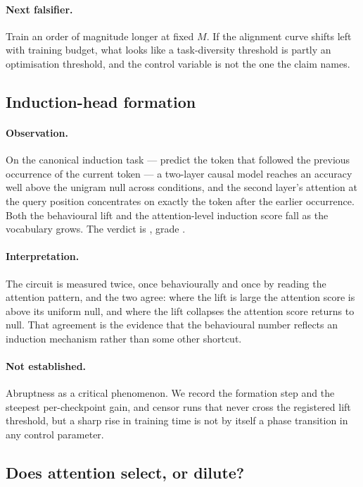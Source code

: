 \paragraph{Next falsifier.}
Train an order of magnitude longer at fixed $M$. If the alignment curve shifts
left with training budget, what looks like a task-diversity threshold is partly
an optimisation threshold, and the control variable is not the one the claim
names.

\subsection{Induction-head formation}

\paragraph{Observation.}
On the canonical induction task --- predict the token that followed the
previous occurrence of the current token --- a two-layer causal model reaches an
accuracy well above the unigram null across
\AtlasInductionHeadConditions{} conditions, and the second layer's attention at
the query position concentrates on exactly the token after the earlier
occurrence. Both the behavioural lift and the attention-level induction score
fall as the vocabulary grows. The verdict is
\emph{\AtlasInductionHeadVerdict{}}, grade \AtlasInductionHeadGrade{}.

\paragraph{Interpretation.}
The circuit is measured twice, once behaviourally and once by reading the
attention pattern, and the two agree: where the lift is large the attention
score is above its uniform null, and where the lift collapses the attention
score returns to null. That agreement is the evidence that the behavioural
number reflects an induction mechanism rather than some other shortcut.

\paragraph{Not established.}
Abruptness as a critical phenomenon. We record the formation step and the
steepest per-checkpoint gain, and censor runs that never cross the registered
lift threshold, but a sharp rise in training time is not by itself a phase
transition in any control parameter.

\subsection{Does attention select, or dilute?}

